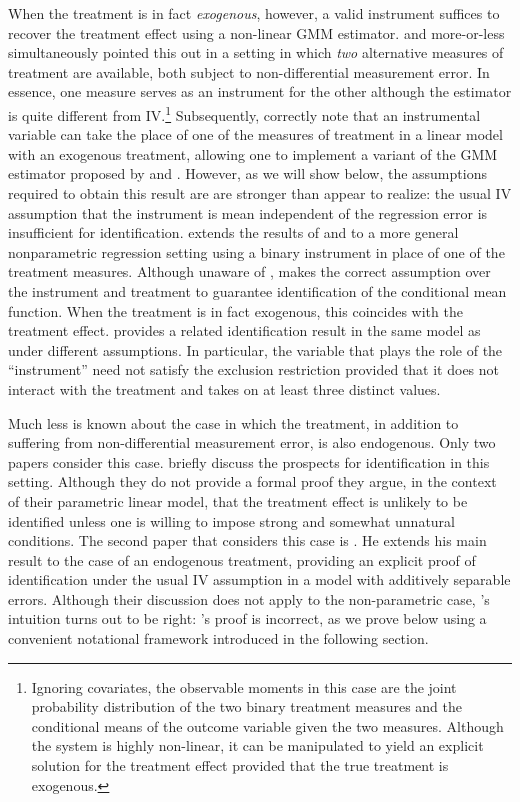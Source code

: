 When the treatment is in fact \emph{exogenous}, however, a valid instrument suffices to recover the treatment effect using a non-linear GMM estimator.
\cite{BBS} and \cite{KRS} more-or-less simultaneously pointed this out in a setting in which \emph{two} alternative measures of treatment are available, both subject to non-differential measurement error.
In essence, one measure serves as an instrument for the other although the estimator is quite different from IV.\footnote{Ignoring covariates, the observable moments in this case are the joint probability distribution of the two binary treatment measures and the conditional means of the outcome variable given the two measures. Although the system is highly non-linear, it can be manipulated to yield an explicit solution for the treatment effect provided that the true treatment is exogenous.}
Subsequently, \cite{FL} correctly note that an instrumental variable can take the place of one of the measures of treatment in a linear model with an exogenous treatment, allowing one to implement a variant of the GMM estimator proposed by \cite{BBS} and \cite{KRS}.
However, as we will show below, the assumptions required to obtain this result are are stronger than \cite{FL} appear to realize: the usual IV assumption that the instrument is mean independent of the regression error is insufficient for identification. 
\cite{Mahajan} extends the results of \cite{BBS} and \cite{KRS} to a more general nonparametric regression setting using a binary instrument in place of one of the treatment measures. 
Although unaware of \cite{FL}, \cite{Mahajan} makes the correct assumption over the instrument and treatment to guarantee identification of the conditional mean function.
When the treatment is in fact exogenous, this coincides with the treatment effect.
\cite{Lewbel} provides a related identification result in the same model as \cite{Mahajan} under different assumptions.
In particular, the variable that plays the role of the ``instrument'' need not satisfy the exclusion restriction provided that it does not interact with the treatment and takes on at least three distinct values. 



Much less is known about the case in which the treatment, in addition to suffering from non-differential measurement error, is also endogenous.
Only two papers consider this case.
\cite{FL} briefly discuss the prospects for identification in this setting.
Although they do not provide a formal proof they argue, in the context of their parametric linear model, that the treatment effect is unlikely to be identified unless one is willing to impose strong and somewhat unnatural conditions. 
The second paper that considers this case is \cite{Mahajan}.
He extends his main result to the case of an endogenous treatment, providing an explicit proof of identification under the usual IV assumption in a model with additively separable errors.
Although their discussion does not apply to the non-parametric case, \citeauthor{FL}'s intuition turns out to be right: \citeauthor{Mahajan}'s proof is incorrect, as we prove below using a convenient notational framework introduced in the following section.




